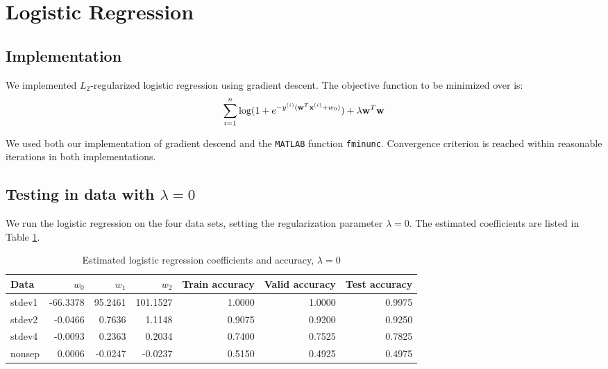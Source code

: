 
\section{Logistic Regression}\label{sec:lr}

\subsection{Implementation}
We implemented $L_2$-regularized logistic regression using gradient descent. The objective function to be minimized over is:
\begin{equation}
\sum_{i=1}^n \log (1 + e^{-y^{(i)}(\boldsymbol{\mathbf{w}}^T\boldsymbol{\mathbf{x}}^{(i)} + w_0)}) + \lambda \boldsymbol{\mathbf{w}}^T\boldsymbol{\mathbf{w}}
\end{equation}

We used both our implementation of gradient descend and the \texttt{MATLAB} function \texttt{fminunc}. Convergence criterion is reached within reasonable iterations in both implementations.

\subsection{Testing in data with $\lambda = 0$}
We run the logistic regression on the four data sets, setting the regularization parameter $\lambda = 0$. The estimated coefficients are listed in Table \ref{tab:LR_reg_coeff}.

\begin{table}[h!]
\centering
\caption{Estimated logistic regression coefficients and accuracy, $\lambda = 0$ }
\begin{tabular}{lrrrrrr}
  \hline\hline
  Data   & $w_0$ 	& $w_1$ 	  & $w_2$ 	& Train accuracy & Valid accuracy & Test accuracy\\
  \hline
  stdev1 & -66.3378  & 95.2461 & 101.1527 & 1.0000    & 1.0000    & 0.9975\\
  stdev2 & -0.0466   & 0.7636  & 1.1148 	& 0.9075    & 0.9200    & 0.9250\\
  stdev4 & -0.0093   & 0.2363  & 0.2034 	& 0.7400    & 0.7525    & 0.7825\\
  nonsep & 0.0006    & -0.0247 & -0.0237	& 0.5150    & 0.4925	   & 0.4975\\
  \hline\hline
\end{tabular}\label{tab:LR_reg_coeff}
\end{table}

